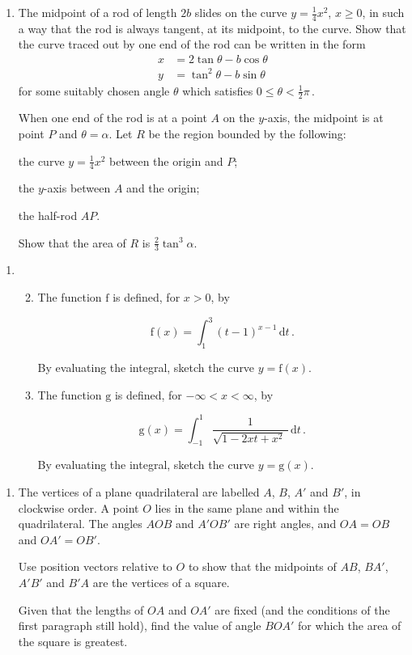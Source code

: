 \documentclass[a4, 11pt]{report}
\newlength{\qspace}
\newcounter{qnumber}
\newenvironment{question}%
 {\vspace{\qspace}
  \begin{enumerate}[\bfseries 1\quad][10]%
    \setcounter{enumi}{\value{qnumber}}%
    \item%
 }
{
  \end{enumerate}
  \filbreak
  \stepcounter{qnumber}
 }
\newenvironment{questionparts}[1][1]%
 {
  \begin{enumerate}[\bfseries (i)]%
    \setcounter{enumii}{#1}
    \addtocounter{enumii}{-1}
    \setlength{\itemsep}{5mm}
    \setlength{\parskip}{8pt}
 }
 {
  \end{enumerate}
 }
\def\d{{\mathrm d}}
\def\g{{\mathrm g}}
\def\f{{\mathrm f}}
\def\le{\leqslant}
\def\ge{\geqslant}
\renewcommand{\.}[1]{\ensuremath{\mathrm{#1}}}
\newcommand{\+}[1]{\ensuremath{\mathbf{#1}}}
\begin{document}
\begin{question}
The midpoint of a rod of length  $2b$ slides on the curve $y =\frac14 x^2$, $x\ge0$, in such a way that the rod is always tangent, at its midpoint,  to the curve. Show that the curve traced out by one end of the rod can be written in the form
\begin{align*}
x& =  2  \tan\theta - b  \cos\theta \\
y& = \tan^2\theta - b \sin\theta 
\end{align*}
for some suitably chosen angle $\theta$ which satisfies $0\le  \theta < \frac12\pi\,$. 

When one end of the rod is at a point $A$ on the $y$-axis, the midpoint is at point $P$ and $\theta = \alpha$. Let $R$ be the region bounded by the following:  



\hspace{2cm}
the curve $y=\frac14x^2$ between the origin and $P$;

\hspace{2cm}
the $y$-axis between $A$ and the origin;

\hspace{2cm}
the half-rod $AP$. 
\noindent

Show that the area of $R$ is $\frac 23 \tan^3 \alpha$.
\end{question}

\begin{question}
\begin{questionparts}
\item The function $\f$ is defined, for $x>0$, by

\[
\f(x) =\int_{1}^3 (t-1)^{x-1} \, \d t
\,.
\]

By evaluating the integral, sketch the curve $y=\f(x)$.

\item The function $\g$ is defined, for  $-\infty<x<\infty$, by

\[
\g(x)= \int_{-1}^1 \frac 1 {\sqrt{1-2xt +x^2} \ }\,  \d t
\,.\]

By evaluating the integral,  sketch the curve  $y=\g(x)$.

\end{questionparts}
\end{question}	

\begin{question}
 The vertices of a plane quadrilateral are labelled $A$, $B$, $A'$ and $B'$, in clockwise order. A point  $O$ lies in the same plane and within the quadrilateral. The angles $AOB$ and $A'OB'$ are right angles, and $OA=OB$ and $OA'=OB'$.
 
Use position   vectors relative to $O$ to show that the midpoints of $AB$, $BA'$, $A'B'$ and $B'A$ are the vertices of a square.

Given that the lengths of $OA$ and $OA'$ are fixed (and the conditions of the first paragraph still hold), find the value of angle $BOA'$ for which the area of the square is greatest.
\end{question}
	
\end{document}
